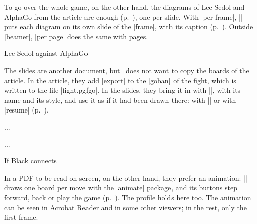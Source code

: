 \begin{goban}
\begin{codeexample}
\end{codeexample}

To go over the whole game, on the other hand, the diagrams of Lee Sedol and AlphaGo from the article are enough (p.~\pageref{tut:partida}), one per slide. With |per frame|, |\sgfdiagrams| puts each diagram on its own slide of the |frame|, with its caption (p.~\pageref{subsec:disposicion}). Outside |beamer|, |per page| does the same with pages.

\begin{codeexample}
	\begin{frame}{Lee Sedol against AlphaGo}
		\centering
	\end{frame}
\end{codeexample}

The slides are another document, but \karu\ does not want to copy the boards of the article. In the article, they add |export| to the |goban| of the fight, which is written to the file |fight.pgfgo|. In the slides, they bring it in with |\pgfgoimport|, with its name and its style, and use it as if it had been drawn there: with |\pgfgoview| or with |resume| (p.~\pageref{subsec:exportar}).

\begin{codeexample}[code only]
	\begin{goban}[partial = A1:G7, name = fight, export = fight]
		...
	\end{goban}

	...
	\begin{frame}{If Black connects}
		\begin{goban}[resume = {fight, marks}, partial = auto]
		\end{goban}
	\end{frame}
\end{codeexample}

In a PDF to be read on screen, on the other hand, they prefer an animation: |\sgfanimation| draws one board per move with the |animate| package, and its buttons step forward, back or play the game (p.~\pageref{subsec:sgf}). The profile holds here too. The animation can be seen in Acrobat Reader and in some other viewers; in the rest, only the first frame.

\begin{codeexample}

\end{codeexample}


\end{goban}
